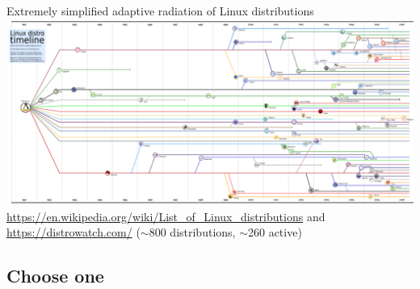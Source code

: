 \documentclass[compress, ucs, xelatex, 11pt, xcolor=svgnames,
  hyperref={
    bookmarks=true,
    unicode=true,
    colorlinks=true,
    pdftitle={Linux, command line and MetaCentrum},
    plainpages=false,
    pdfauthor={Vojtech Zeisek},
    pdfsubject={Course about use of Linux command line, writing shell scripts and using MetaCentrum of CESNET},
    pdfcreator={XeLaTeX},
    pdfkeywords={Linux, GNU, BASH, shell, command line, MetaCentrum},
    linkcolor=Red,
    anchorcolor=Blue,
    citecolor=Purple,
    filecolor=DodgerBlue,
    menucolor=DarkOrchid,
    urlcolor=DeepSkyBlue,
    pdftex},
  url={hyphens, lowtilde} %
  ]{beamer}
\begin{document}
\begin{frame}{Extremely simplified adaptive radiation of Linux distributions}
  \includegraphics[width=\textwidth]{linux_fylogen_2.png}\\
  \url{https://en.wikipedia.org/wiki/List_of_Linux_distributions} and \url{https://distrowatch.com/} ($\sim$800 distributions, $\sim$260 active)
\end{frame}

\subsection{Choose one}
\end{document}
